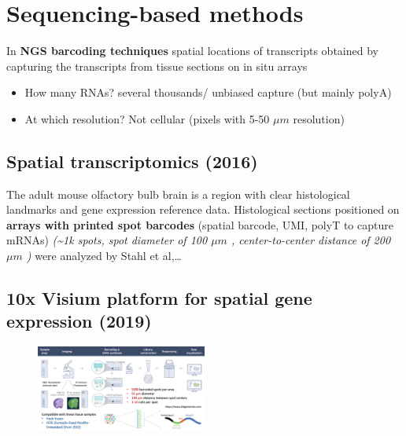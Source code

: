 \hypertarget{sequencing-based-methods}{%
\section{Sequencing-based methods}\label{sequencing-based-methods}}

In \textbf{NGS barcoding techniques} spatial locations of transcripts
obtained by capturing the transcripts from tissue sections on in situ
arrays

\begin{itemize}
\tightlist
\item
  How many RNAs? several thousands/ unbiased capture (but mainly polyA)
\item
  At which resolution? Not cellular (pixels with 5-50 $\mu m$ resolution)
\end{itemize}

\hypertarget{spatial-transcriptomics-2016}{%
\subsection{Spatial transcriptomics
(2016)}\label{spatial-transcriptomics-2016}}

The adult mouse olfactory bulb brain is a region with clear histological
landmarks and gene expression reference data. Histological sections
positioned on \textbf{arrays with printed spot barcodes} (spatial
barcode, UMI, polyT to capture mRNAs) \emph{(\textasciitilde1k spots,
spot diameter of 100 $\mu m$ , center-to-center distance of 200 $\mu m$ )} were
analyzed by Stahl et al,\ldots{}

\hypertarget{x-visium-platform-for-spatial-gene-expression-2019}{%
\subsection{10x Visium platform for spatial gene expression
(2019)}\label{x-visium-platform-for-spatial-gene-expression-2019}}

\begin{figure}
\centering
\includegraphics[width=0.5\textwidth]{images/Screenshot.png}
\caption{}
\end{figure}

